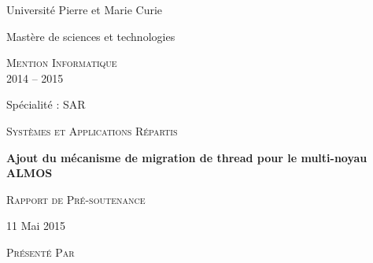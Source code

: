 \begin{titlepage}  

  {\begin{center}\huge\textsf{Université Pierre et Marie Curie}\end{center}}


  \vspace{0.4cm}
  

  {\begin{center}\huge\textsf{Mastère de sciences et technologies}\end{center}}
  
  \vspace{0.4cm}
  
  {\begin{center}\huge\textsc{Mention Informatique \\2014 -- 2015} \end{center}}
  
  \vspace{0.4cm}
  
  {\begin{center}\huge\textsf{Spécialité : SAR}\end{center}}
  
  {\begin{center}\large\textsc{Systèmes et Applications Répartis }\end{center}}
  
  \vspace{0.4cm}

  {\begin{center}\Huge\textbf{Ajout du mécanisme de migration de thread pour le
        multi-noyau ALMOS}\end{center}}
  
  \vspace{0.4cm}
  
  {\begin{center}\huge\textsc{Rapport de Pré-soutenance}\end{center}}
  
  \vspace{0.4cm}
  
  {\begin{center}\large\textsf {11 Mai 2015 }\end{center}}
  
  \vspace{0.4cm}
  
  {\begin{center}\Large\textsc{Présenté Par}\end{center}}
  

\end{titlepage}
